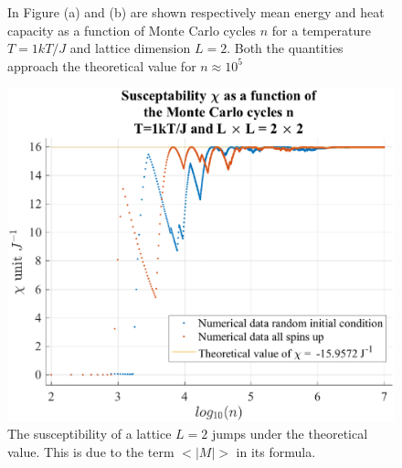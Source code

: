 \documentclass[%
preprint,
 amsmath,amssymb,
 aps,
]{revtex4-1}
\theoremstyle{plain}
\theoremstyle{definition}
\theoremstyle{plain}
\begin{document}
\begin{figure}[h!]
\centering
\caption{In Figure (a) and (b) are shown respectively mean energy and heat capacity as a function of Monte Carlo cycles $n$ for a temperature $T=1 kT/J$ and lattice dimension $L=2$. Both the quantities approach the theoretical value for $n \approx 10^5$}
\end{figure}
\begin{figure}[h]
\includegraphics[scale=0.50]{chi2x2.eps}
\caption{The susceptibility of a lattice $L=2$ jumps under the theoretical value. This is due to the term $<|M|>$  in its formula.}
\label{chi2x2}
\end{figure}
\end{document}

